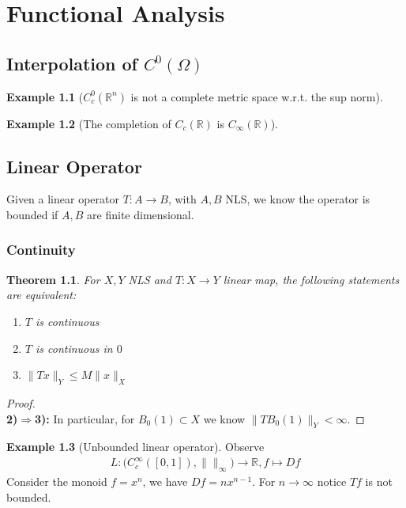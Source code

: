\documentclass[a4paper,11pt,fleqn]{book}
\newtheorem{theorem}{Theorem}[section]
\theoremstyle{definition}
\newtheorem*{example}{Example}
\theoremstyle{remark}
\begin{document}
\chapter{Functional Analysis}
\section{Interpolation of \texorpdfstring{$C^0(\Omega)$}{C\textasciicircum{}0(Omega)}}

\begin{example}[$C_c^0(\mathbb{R}^n)$ is not a complete metric space w.r.t. the sup norm]
\end{example}

\begin{example}[The completion of $C_c(\mathbb{R})$ is $C_\infty(\mathbb{R})$]
\end{example}


\section{Linear Operator}
Given a linear operator $T: A \rightarrow B$, with $A, B$ NLS, we know the operator is bounded if $A, B$ are finite dimensional. 
\subsection{Continuity}
\begin{theorem}
For $X, Y$ NLS and $T:X \rightarrow Y$ linear map, the following statements are equivalent:
\begin{enumerate}
	\item $T$ is continuous
	\item $T$ is continuous in $0$
	\item $\|Tx\|_Y \le M \|x\|_X$
\end{enumerate}
\end{theorem}
\begin{proof}
\quad\\
\textbf{2)$\Rightarrow$3):} In particular, for $B_0(1) \subset X$ we know $\|T B_0(1)\|_Y < \infty$. 
\end{proof}
\begin{example}[Unbounded linear operator]
	Observe
	\begin{align*}
		L: \bigg(C_c^\infty([0, 1]), \|\|_\infty \bigg) \rightarrow \mathbb{R}, f \mapsto Df
	\end{align*}
	Consider the monoid $f = x^n$, we have $Df = n x^{n -1}$. For $n \rightarrow \infty$ notice $Tf$ is not bounded. 
\end{example}
\end{document}
